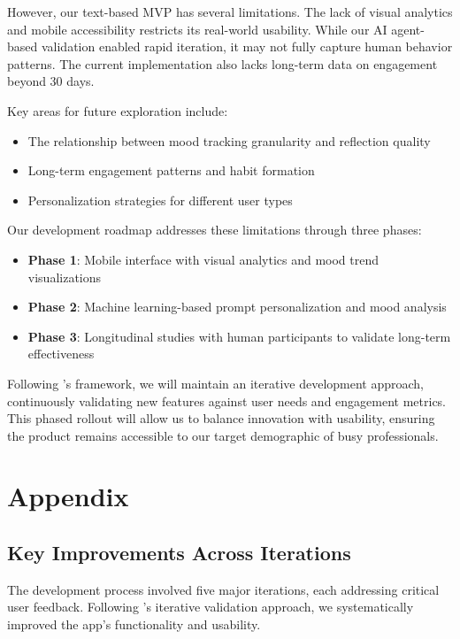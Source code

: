 \documentclass{article} %
\begin{document}
However, our text-based MVP has several limitations. The lack of visual analytics and mobile accessibility restricts its real-world usability. While our AI agent-based validation enabled rapid iteration, it may not fully capture human behavior patterns. The current implementation also lacks long-term data on engagement beyond 30 days.

Key areas for future exploration include:
\begin{itemize}
    \item The relationship between mood tracking granularity and reflection quality
    \item Long-term engagement patterns and habit formation
    \item Personalization strategies for different user types
\end{itemize}

Our development roadmap addresses these limitations through three phases:
\begin{itemize}
    \item \textbf{Phase 1}: Mobile interface with visual analytics and mood trend visualizations
    \item \textbf{Phase 2}: Machine learning-based prompt personalization and mood analysis
    \item \textbf{Phase 3}: Longitudinal studies with human participants to validate long-term effectiveness
\end{itemize}

Following \citet{lu2024aiscientist}'s framework, we will maintain an iterative development approach, continuously validating new features against user needs and engagement metrics. This phased rollout will allow us to balance innovation with usability, ensuring the product remains accessible to our target demographic of busy professionals.

\section{Appendix}
\label{sec:appendix}

\subsection{Key Improvements Across Iterations}
The development process involved five major iterations, each addressing critical user feedback. Following \citet{lu2024aiscientist}'s iterative validation approach, we systematically improved the app's functionality and usability.
\end{document}
